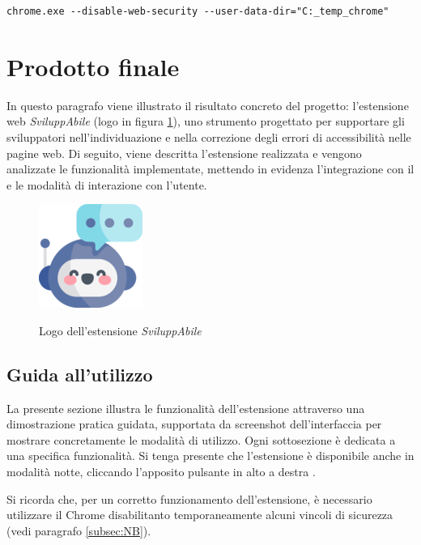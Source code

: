\begin{verbatim}
chrome.exe --disable-web-security --user-data-dir="C:_temp_chrome"
\end{verbatim}


\section{Prodotto finale}
\noindent In questo paragrafo viene illustrato il risultato concreto del progetto: l’estensione web \textit{SviluppAbile} (logo in figura \ref{fig:logo_sviluppabile}), uno strumento progettato per supportare gli sviluppatori nell’individuazione e nella correzione degli errori di accessibilità nelle pagine web. Di seguito, viene descritta l’estensione realizzata e vengono analizzate le funzionalità implementate, mettendo in evidenza l’integrazione con il  e le modalità di interazione con l’utente.

\begin{figure}[H]
    \centering
    \includegraphics[width=0.15\linewidth, alt={Logo dell'estensione \textit{SviluppAbile}}]{img/sviluppabile.png}
    \caption{Logo dell'estensione \textit{SviluppAbile}}\label{fig:logo_sviluppabile}
\end{figure}

\subsection{Guida all'utilizzo}
\noindent La presente sezione illustra le funzionalità dell’estensione attraverso una dimostrazione pratica guidata, supportata da screenshot dell’interfaccia per mostrare concretamente le modalità di utilizzo. Ogni sottosezione è dedicata a una specifica funzionalità. Si tenga presente che l'estensione è disponibile anche in modalità notte, cliccando l'apposito pulsante in alto a destra .

\noindent Si ricorda che, per un corretto funzionamento dell'estensione, è necessario utilizzare il  Chrome disabilitanto temporaneamente alcuni vincoli di sicurezza (vedi paragrafo \ref{subsec:NB}).

